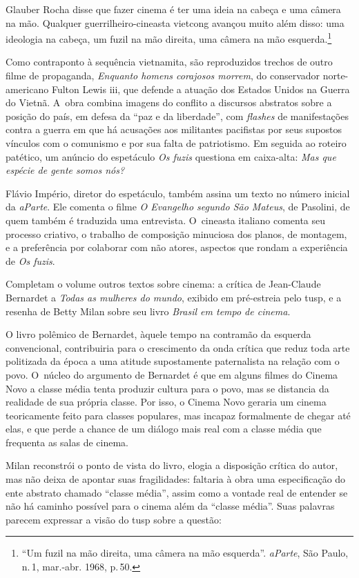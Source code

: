 \startblockquote
Glauber Rocha disse que fazer cinema é ter uma ideia na cabeça e uma
câmera na mão. Qualquer guerrilheiro-cineasta vietcong avançou muito
além disso: uma ideologia na cabeça, um fuzil na mão direita, uma câmera
na mão esquerda.\footnote{“Um fuzil na mão direita, uma câmera na mão
  esquerda”. {\it aParte}, São Paulo, n.\,1, mar.-abr. 1968, p.\,50.}
\stopblockquote

Como contraponto à sequência vietnamita, são reproduzidos trechos de
outro filme de propaganda, {\it Enquanto homens corajosos morrem}, do
conservador norte-americano Fulton Lewis {\sc iii}, que defende a atuação dos
Estados Unidos na Guerra do Vietnã. A~obra combina imagens do conflito a
discursos abstratos sobre a posição do país, em defesa da “paz e da
liberdade”, com {\it flashes} de manifestações contra a guerra em que há
acusações aos militantes pacifistas por seus supostos vínculos com o
comunismo e por sua falta de patriotismo. Em seguida ao roteiro patético, um
anúncio do espetáculo {\it Os fuzis} questiona em caixa-alta:
{\it Mas que espécie de gente somos nós?}

Flávio Império, diretor do espetáculo, também assina um texto no
número inicial da {\it aParte}. Ele comenta o filme {\it O Evangelho
segundo São Mateus}, de Pasolini, de quem também é traduzida uma
entrevista. O~cineasta italiano comenta seu processo criativo, o
trabalho de composição minuciosa dos planos, de montagem, e a
preferência por colaborar com não atores, aspectos que rondam a
experiência de {\it Os fuzis}.

Completam o volume outros textos sobre cinema: a crítica de Jean-Claude
Bernardet a {\it Todas as mulheres do mundo}, exibido em pré-estreia
pelo {\sc tusp}, e a resenha de Betty Milan sobre seu livro {\it Brasil em tempo de cinema}.

O livro polêmico de Bernardet, àquele tempo na contramão da esquerda
convencional, contribuiria para o crescimento da onda crítica que reduz
toda arte politizada da época a uma atitude supostamente paternalista na
relação com o povo. O~núcleo do argumento de Bernardet é que em alguns
filmes do Cinema Novo a classe média tenta produzir cultura para o povo,
mas se distancia da realidade de sua própria classe. Por isso, o Cinema
Novo geraria um cinema teoricamente feito para classes
populares, mas incapaz formalmente de chegar até elas, e que perde a
chance de um diálogo mais real com a classe média que frequenta as salas
de cinema.

Milan reconstrói o ponto de vista do livro, elogia a disposição crítica
do autor, mas não deixa de apontar suas fragilidades: faltaria à obra
uma especificação do ente abstrato chamado “classe média”, assim como a
vontade real de entender se não há caminho possível para o cinema além
da “classe média”. Suas palavras parecem expressar a visão do {\sc tusp} sobre
a questão:


